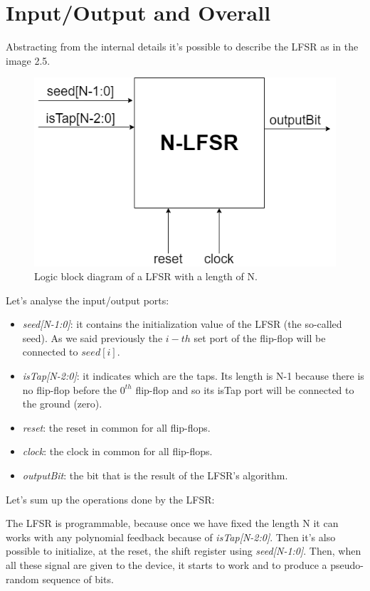 \documentclass[a4paper]{report}
\begin{document}
\section{Input/Output and Overall}
Abstracting from the internal details it's possible to describe the LFSR as in the image 2.5.
\begin{figure}[htpb]
	\centering
	\includegraphics[scale=0.5]{img/LFSR-overall.png}
	\caption{Logic block diagram of a LFSR with a length of N.}
\end{figure}

\noindent Let's analyse the input/output ports:
\begin{itemize}
	\item \emph{seed[N-1:0]}: it contains the initialization value of the LFSR (the so-called seed). As we said previously the $i-th$ set port of the flip-flop will be connected to $seed[i]$.
	\item \emph{isTap[N-2:0]}: it indicates which are the taps. Its length is N-1 because there is no flip-flop before the $0^{th}$ flip-flop and so its isTap port will be connected to the ground (zero).
	\item \emph{reset}: the reset in common for all flip-flops.
	\item \emph{clock}: the clock in common for all flip-flops.
	\item \emph{outputBit}: the bit that is the result of the LFSR's algorithm.
\end{itemize} 
Let's sum up the operations done by the LFSR:

\noindent The LFSR is programmable, because once we have fixed the length N it can works with any polynomial feedback because of \emph{isTap[N-2:0]}. Then it's also possible to initialize, at the reset, the shift register using \emph{seed[N-1:0]}. Then, when all these signal are given to the device, it starts to work and to produce a pseudo-random sequence of bits.
\end{document}
